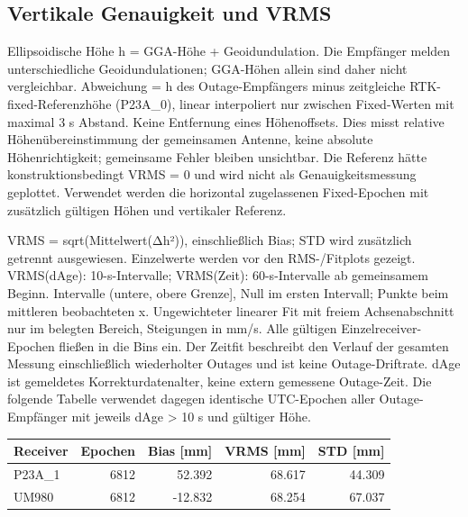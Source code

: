 \documentclass[11pt,a4paper]{article}
\numberwithin{equation}{section}
\numberwithin{figure}{section}
\begin{document}
\subsection{Vertikale Genauigkeit und VRMS}

Ellipsoidische Höhe h = GGA-Höhe + Geoidundulation. Die Empfänger melden unterschiedliche Geoidundulationen; GGA-Höhen allein sind daher nicht vergleichbar. Abweichung = h des Outage-Empfängers minus zeitgleiche RTK-fixed-Referenzhöhe (P23A\_0), linear interpoliert nur zwischen Fixed-Werten mit maximal 3 s Abstand. Keine Entfernung eines Höhenoffsets. Dies misst relative Höhenübereinstimmung der gemeinsamen Antenne, keine absolute Höhenrichtigkeit; gemeinsame Fehler bleiben unsichtbar. Die Referenz hätte konstruktionsbedingt VRMS = 0 und wird nicht als Genauigkeitsmessung geplottet. Verwendet werden die horizontal zugelassenen Fixed-Epochen mit zusätzlich gültigen Höhen und vertikaler Referenz.

VRMS = sqrt(Mittelwert(Δh²)), einschließlich Bias; STD wird zusätzlich getrennt ausgewiesen. Einzelwerte werden vor den RMS-/\allowbreak{}Fitplots gezeigt. VRMS(dAge): 10-s-Intervalle; VRMS(Zeit): 60-s-Intervalle ab gemeinsamem Beginn. Intervalle (untere, obere Grenze], Null im ersten Intervall; Punkte beim mittleren beobachteten x. Ungewichteter linearer Fit mit freiem Achsenabschnitt nur im belegten Bereich, Steigungen in mm/\allowbreak{}s. Alle gültigen Einzelreceiver-Epochen fließen in die Bins ein. Der Zeitfit beschreibt den Verlauf der gesamten Messung einschließlich wiederholter Outages und ist keine Outage-Driftrate. dAge ist gemeldetes Korrekturdatenalter, keine extern gemessene Outage-Zeit. Die folgende Tabelle verwendet dagegen identische UTC-Epochen aller Outage-Empfänger mit jeweils dAge > 10 s und gültiger Höhe.

\begin{center}\begin{lrbox}{\reporttable}\small\setlength{\tabcolsep}{4pt}\begin{tabular}{lrrrr}\toprule
Receiver & Epochen & Bias [mm] & VRMS [mm] & STD [mm]\\\midrule
P23A\_1 & 6812 & 52.392 & 68.617 & 44.309\\
UM980 & 6812 & -12.832 & 68.254 & 67.037\\
\bottomrule\end{tabular}\end{lrbox}\ifdim\wd\reporttable>\linewidth\resizebox{\linewidth}{!}{\usebox{\reporttable}}\else\usebox{\reporttable}\fi\end{center}
\end{document}
